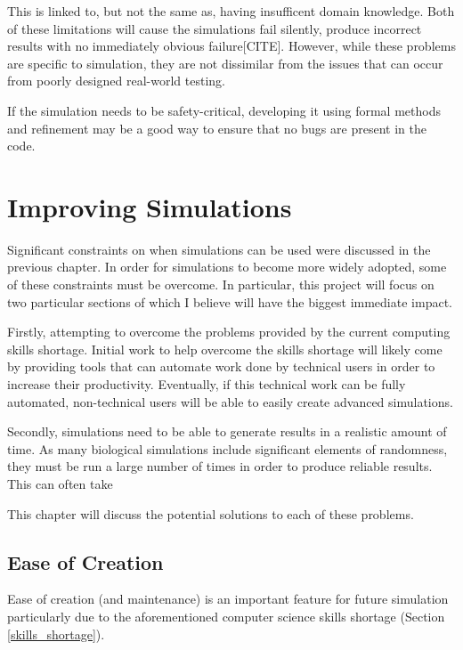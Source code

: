 \documentclass{UoYCSproject}
\begin{document}
This is linked to, but not the same as, having insufficent domain knowledge. Both of these limitations will cause the simulations fail silently, produce incorrect results with no immediately obvious failure[CITE]. However, while these problems are specific to simulation, they are not dissimilar from the issues that can occur from poorly designed real-world testing. %

If the simulation needs to be safety-critical, developing it using formal methods and refinement may be a good way to ensure that no bugs are present in the code.

\section{Improving Simulations}
\label{improvements}
Significant constraints on when simulations can be used were discussed in the previous chapter. In order for simulations to become more widely adopted, some of these constraints must be overcome. 
In particular, this project will focus on two particular sections of which I believe will have the biggest immediate impact.

Firstly, attempting to overcome the problems provided by the current computing skills shortage. 
Initial work to help overcome the skills shortage will likely come by providing tools that can automate work done by technical users in order to increase their productivity.
Eventually, if this technical work can be fully automated, non-technical users will be able to easily create advanced simulations.

Secondly, simulations need to be able to generate results in a realistic amount of time. As many biological simulations include significant elements of randomness, they must be run a large number of times in order to produce reliable results. This can often take 

This chapter will discuss the potential solutions to each of these problems.

\subsection{Ease of Creation}
Ease of creation (and maintenance) is an important feature for future simulation particularly due to the aforementioned computer science skills shortage (Section \ref{skills_shortage}).
\end{document}
